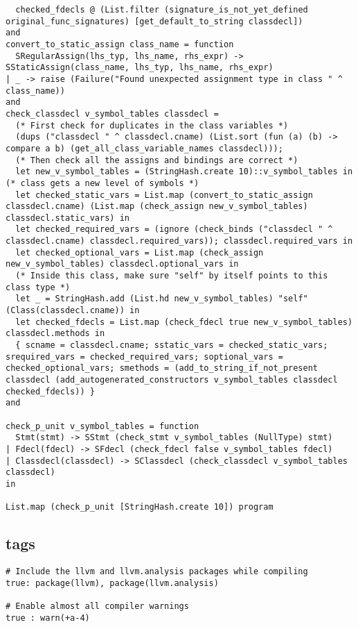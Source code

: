 \documentclass{article}
\begin{document}
\begin{verbatim}
  checked_fdecls @ (List.filter (signature_is_not_yet_defined original_func_signatures) [get_default_to_string classdecl])
and
convert_to_static_assign class_name = function
  SRegularAssign(lhs_typ, lhs_name, rhs_expr) -> SStaticAssign(class_name, lhs_typ, lhs_name, rhs_expr)
| _ -> raise (Failure("Found unexpected assignment type in class " ^ class_name))
and
check_classdecl v_symbol_tables classdecl =
  (* First check for duplicates in the class variables *)
  (dups ("classdecl " ^ classdecl.cname) (List.sort (fun (a) (b) -> compare a b) (get_all_class_variable_names classdecl)));
  (* Then check all the assigns and bindings are correct *)
  let new_v_symbol_tables = (StringHash.create 10)::v_symbol_tables in (* class gets a new level of symbols *)
  let checked_static_vars = List.map (convert_to_static_assign classdecl.cname) (List.map (check_assign new_v_symbol_tables) classdecl.static_vars) in
  let checked_required_vars = (ignore (check_binds ("classdecl " ^ classdecl.cname) classdecl.required_vars)); classdecl.required_vars in
  let checked_optional_vars = List.map (check_assign new_v_symbol_tables) classdecl.optional_vars in
  (* Inside this class, make sure "self" by itself points to this class type *)
  let _ = StringHash.add (List.hd new_v_symbol_tables) "self" (Class(classdecl.cname)) in
  let checked_fdecls = List.map (check_fdecl true new_v_symbol_tables) classdecl.methods in
  { scname = classdecl.cname; sstatic_vars = checked_static_vars; srequired_vars = checked_required_vars; soptional_vars = checked_optional_vars; smethods = (add_to_string_if_not_present classdecl (add_autogenerated_constructors v_symbol_tables classdecl checked_fdecls)) }
and

check_p_unit v_symbol_tables = function
  Stmt(stmt) -> SStmt (check_stmt v_symbol_tables (NullType) stmt)
| Fdecl(fdecl) -> SFdecl (check_fdecl false v_symbol_tables fdecl)
| Classdecl(classdecl) -> SClassdecl (check_classdecl v_symbol_tables classdecl)
in

List.map (check_p_unit [StringHash.create 10]) program
\end{verbatim}




\subsection{\textunderscore tags} 
\begin{verbatim}
# Include the llvm and llvm.analysis packages while compiling
true: package(llvm), package(llvm.analysis)

# Enable almost all compiler warnings
true : warn(+a-4)
\end{verbatim}
\end{document}
